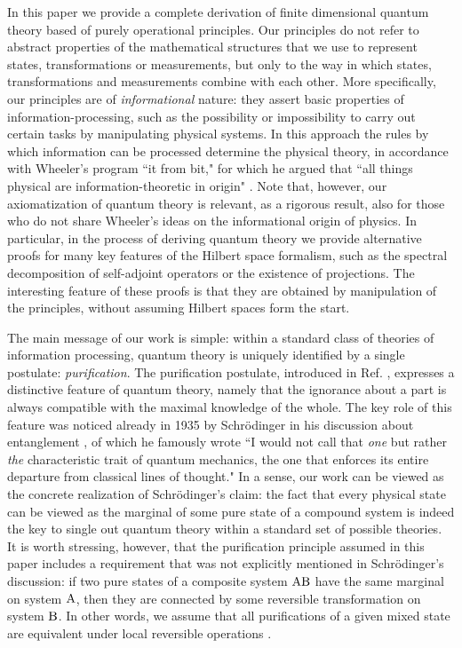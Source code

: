 \documentclass[12pt,aps,pra,showpacs,groupedaddress]{revtex4-1}
\def\rB{{\rm B}}
\begin{document}
In this paper we provide a complete derivation of finite dimensional quantum theory based of purely operational
principles. Our principles do not refer to abstract properties of the mathematical structures that we use to represent
states, transformations or measurements, but only to the way in which states, transformations and measurements combine with each other.  More specifically, our principles are of \emph{informational} nature:  they assert basic properties of information-processing, such as the possibility or impossibility to carry
out certain  tasks by manipulating physical systems. In this approach the rules by which information can be processed determine the physical theory,  in  accordance with Wheeler's program ``it from bit," for which he argued that   ``all things physical are information-theoretic in origin" \cite{wheeler}.   Note that, however, our axiomatization of quantum theory is relevant, as a rigorous result,  also for those who do not share Wheeler's ideas on the informational origin of physics. In particular, in the process of deriving quantum theory we provide alternative proofs for many key features of the Hilbert space formalism, such as the spectral decomposition of  self-adjoint operators or the existence of projections.  The interesting feature of these proofs is that they are obtained by manipulation of the principles, without assuming Hilbert spaces form the start. 



The main message of our work is simple: within a standard class of theories of information processing,
quantum theory is uniquely identified by a single postulate: \emph{purification}.  The purification
postulate, introduced in Ref. \cite{purification}, expresses a distinctive feature of quantum
theory, namely that the ignorance about a part is always compatible with the maximal knowledge of the
whole. The key role of this feature was noticed already in 1935 by Schr\"odinger in his discussion
about entanglement \cite{Schr35}, of which he famously wrote ``I would not call that \emph{one} but
rather {\em the} characteristic trait of quantum mechanics, the one that enforces its entire
departure from classical lines of thought."  In a sense, our work can be viewed as the concrete
realization of Schr\"odinger's claim: the fact that every physical state can be viewed as the
marginal of some pure state of a compound system is indeed the key to single out quantum theory within a standard set of possible theories.  It
is worth stressing, however, that the purification principle assumed in this paper includes a requirement that was not explicitly mentioned in Schr\"odinger's discussion: if two pure states of a composite system $\rA\rB$ have the same marginal on system ${\rm A}$, then they are connected by some
reversible transformation on system $\rB$.  In other words, we assume that all purifications of a given mixed state are equivalent under local reversible operations
\cite{anchese...}.    
\end{document}
